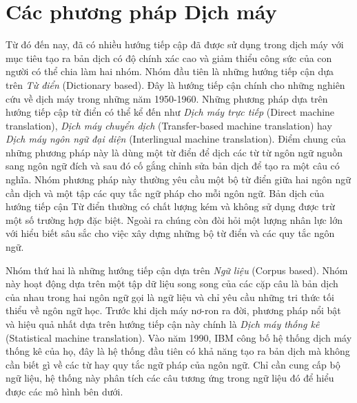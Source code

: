 

\section{Các phương pháp Dịch máy}
Từ đó đến nay, đã có nhiều hướng tiếp cập đã được sử dụng trong dịch máy với mục tiêu tạo ra bản dịch có độ chính xác cao và giảm thiểu công sức của con người có thể chia làm hai nhóm. Nhóm đầu tiên là những hướng tiếp cận dựa trên \textit{Từ điển} (Dictionary based). Đây là hướng tiếp cận chính cho những nghiên cứu về dịch máy trong những năm 1950-1960. Những phương pháp dựa trên hướng tiếp cập từ điển có thể kể đến như \textit{Dịch máy trực tiếp} (Direct machine translation), \textit{Dịch máy chuyển dịch} (Transfer-based machine translation) hay \textit{Dịch máy ngôn ngữ đại diện} (Interlingual machine translation). Điểm chung của những phương pháp này là dùng một từ điển để dịch các từ từ ngôn ngữ nguồn sang ngôn ngữ đích và sau đó cố gắng chỉnh sửa bản dịch để tạo ra một câu có nghĩa. Nhóm phương pháp này thường yêu cầu một bộ từ điển giữa hai ngôn ngữ cần dịch và một tập các quy tắc ngữ pháp cho mỗi ngôn ngữ. Bản dịch của hướng tiếp cận Từ điển thường có chất lượng kém và không sử dụng được trừ một số trường hợp đặc biệt. Ngoài ra chúng còn đòi hỏi một lượng nhân lực lớn với hiểu biết sâu sắc cho việc xây dựng những bộ từ điển và các quy tắc ngôn ngữ. 

Nhóm thứ hai là những hướng tiếp cận dựa trên \textit{Ngữ liệu} (Corpus based). Nhóm này hoạt động dựa trên một tập dữ liệu song song của các cặp câu là bản dịch của nhau trong hai ngôn ngữ gọi là ngữ liệu và chỉ yêu cầu những tri thức tối thiểu về ngôn ngữ học. Trước khi dịch máy nơ-ron ra đời, phương pháp nổi bật và hiệu quả nhất dựa trên hướng tiếp cận này chính là \textit{Dịch máy thống kê} (Statistical machine translation). Vào năm 1990, IBM công bố hệ thống dịch máy thống kê của họ, đây là hệ thống đầu tiên có khả năng tạo ra bản dịch mà không cần biết gì về các từ hay quy tắc ngữ pháp của ngôn ngữ. Chỉ cần cung cấp bộ ngữ liệu, hệ thống này phân tích các câu tương ứng trong ngữ liệu đó để hiểu được các mô hình bên dưới.

